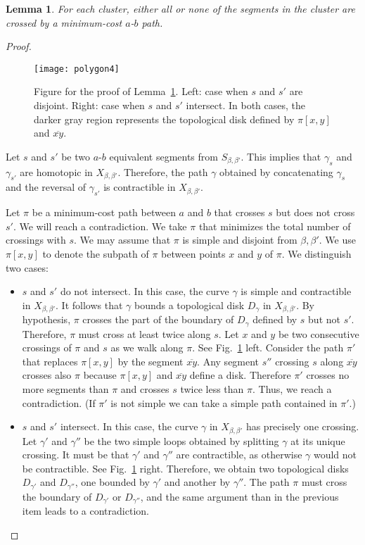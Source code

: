 \documentclass[11pt,a4paper]{article}
\newtheorem{lemma}[definition]{Lemma}
\newcommand\segment[1]{\ensuremath{\overline{#1}}}
\begin{document}
\begin{lemma}\label{le:clusters2}
For each cluster, either all or none of the 
segments in the cluster are crossed by a minimum-cost $a$-$b$ path. 
\end{lemma}
\begin{proof}

\begin{figure}[t]
\centering
\texttt{[image: polygon4]}
\caption{Figure for the proof of Lemma~\ref{le:clusters2}. Left: case when $s$ and $s'$ are disjoint.
	Right: case when $s$ and $s'$ intersect. In both cases, the darker gray region represents the topological disk defined by $\pi[x,y]$ and $\segment{xy}$.}
\label{fig:polygon4}
\end{figure}

Let $s$ and $s'$ be two $a$-$b$ equivalent segments from $S_{\beta,\beta'}$.
This implies that $\gamma_s$ and $\gamma_{s'}$ are homotopic in $X_{\beta,\beta'}$.
Therefore, the path $\gamma$ obtained by concatenating $\gamma_s$ and the reversal of $\gamma_{s'}$ is contractible in $X_{\beta,\beta'}$.

Let $\pi$ be a minimum-cost path between $a$ and $b$ that crosses $s$ but does not cross $s'$.
We will reach a contradiction.
We take $\pi$ that minimizes the total number of crossings with $s$. 
We may assume that $\pi$ is simple and disjoint from $\beta,\beta'$.
We use $\pi[x,y]$ to denote the subpath of $\pi$ between points $x$ and $y$ of $\pi$. 
We distinguish two cases:
\begin{itemize}
	\item $s$ and $s'$ do not intersect. In this case, the curve $\gamma$ is simple and contractible
		in $X_{\beta,\beta'}$. It follows that $\gamma$ bounds a topological disk $D_\gamma$ in $X_{\beta,\beta'}$.
		By hypothesis, $\pi$ crosses the part of the boundary of $D_\gamma$ defined by $s$ but
		not $s'$. Therefore, $\pi$ must cross at least twice along $s$. Let $x$ and $y$ be two consecutive crossings of $\pi$ and $s$
		as we walk along $\pi$. See Fig.~\ref{fig:polygon4} left. Consider the path $\pi'$ that replaces $\pi[x,y]$ by the segment $\segment{xy}$.
		Any segment $s''$ crossing $s$ along $\segment{xy}$ crosses also $\pi$ because $\pi[x,y]$ and $\segment{xy}$ define a disk.
		Therefore $\pi'$ crosses no more segments than $\pi$ and crosses $s$ twice less than $\pi$.
		Thus, we reach a contradiction. (If $\pi'$ is not simple we can take a simple path contained in $\pi'$.)
	\item $s$ and $s'$ intersect. In this case, the curve $\gamma$ 
		in $X_{\beta,\beta'}$ has precisely one crossing. Let $\gamma'$ and $\gamma''$ be the two simple loops
		obtained by splitting $\gamma$ at its unique crossing. It must be that $\gamma'$ and $\gamma''$ are contractible,
		as otherwise $\gamma$ would not be contractible. See Fig.~\ref{fig:polygon4} right.
		Therefore, we obtain two topological disks $D_{\gamma'}$ and $D_{\gamma''}$, one bounded by $\gamma'$ and another by $\gamma''$.
		The path $\pi$ must cross the boundary of $D_{\gamma'}$ or $D_{\gamma''}$, and the same argument than in the previous item
		leads to a contradiction.\qedhere
\end{itemize}
\end{proof}
\end{document}
